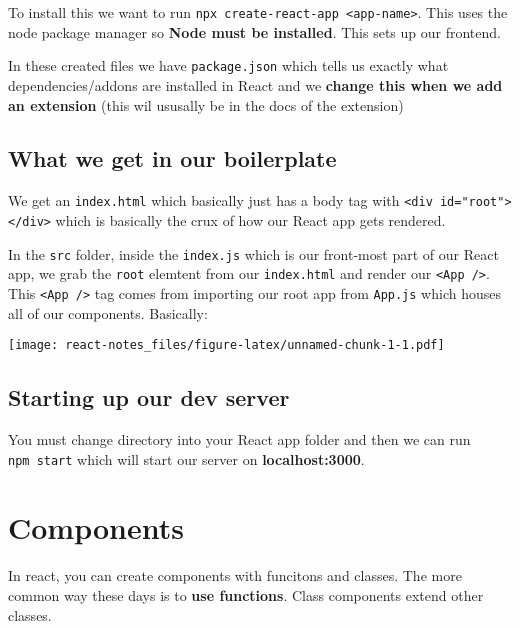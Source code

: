 \documentclass[
]{report}
\begin{document}
To install this we want to run \texttt{npx\ create-react-app\ \textless{}app-name\textgreater{}}. This uses the node package manager so \textbf{Node must be installed}. This sets up our frontend.

In these created files we have \texttt{package.json} which tells us exactly what dependencies/addons are installed in React and we \textbf{change this when we add an extension} (this wil ususally be in the docs of the extension)

\hypertarget{what-we-get-in-our-boilerplate}{%
\subsection{What we get in our boilerplate}\label{what-we-get-in-our-boilerplate}}

We get an \texttt{index.html} which basically just has a body tag with \texttt{\textless{}div\ id="root"\textgreater{}\textless{}/div\textgreater{}} which is basically the crux of how our React app gets rendered.

In the \texttt{src} folder, inside the \texttt{index.js} which is our front-most part of our React app, we grab the \texttt{root} elemtent from our \texttt{index.html} and render our \texttt{\textless{}App\ /\textgreater{}}. This \texttt{\textless{}App\ /\textgreater{}} tag comes from importing our root app from \texttt{App.js} which houses all of our components. Basically:

\texttt{[image: react-notes\_files/figure-latex/unnamed-chunk-1-1.pdf]}

\hypertarget{starting-up-our-dev-server}{%
\subsection{Starting up our dev server}\label{starting-up-our-dev-server}}

You must change directory into your React app folder and then we can run \texttt{npm\ start} which will start our server on \textbf{localhost:3000}.

\hypertarget{components}{%
\section{Components}\label{components}}

In react, you can create components with funcitons and classes. The more common
way these days is to \textbf{use functions}. Class components extend other classes.
\end{document}
